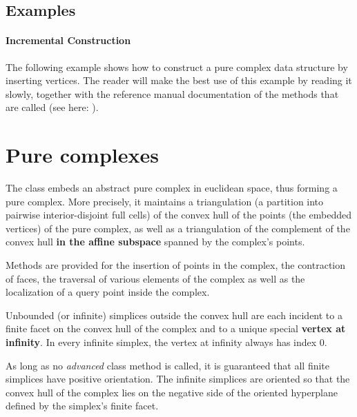 {{%

\subsection{Examples\label{triangulation:tds:examples}}
 
\paragraph{Incremental Construction}
The following example shows how to construct a pure complex data structure by
inserting vertices. The reader will make the best use of this example by
reading it slowly, together with the reference manual documentation of the
methods that are called (see here: ).




\section{Pure complexes}

The class  embeds an abstract pure
complex in euclidean space, thus forming a pure complex. More precisely, it
maintains a triangulation (a partition into pairwise interior-disjoint full
cells) of the convex hull of the points (the embedded vertices) of the
pure complex, as well as a triangulation of the complement of the convex hull
\textbf{in the affine subspace} spanned by the complex's points.

Methods are provided for the insertion of points in the complex, the
contraction of faces, the traversal of various elements of the complex
as well as the localization of a query point inside the complex.

Unbounded (or infinite) simplices outside the convex hull are each incident to
a finite facet on the convex hull of the complex and to a unique special
\textbf{vertex at infinity}. In every infinite simplex, the vertex at infinity
always has index $0$.

As long as no \emph{advanced} class method is called, it is guaranteed that
all finite simplices have positive orientation. The infinite simplices are
oriented so that the convex hull of the complex lies on the negative side of
the oriented hyperplane defined by the simplex's finite facet.


}}

